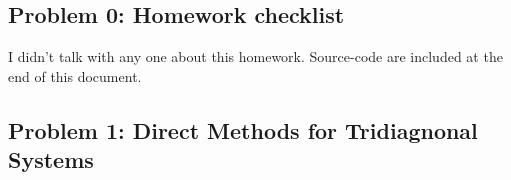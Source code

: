 \documentclass{article}
\begin{document}
 



\hypertarget{problem_0_homework_checklist_2}{}
\subsection*{{Problem 0: Homework checklist}}
\label{problem_0_homework_checklist_2}

\checkmark	I didn't talk with any one about this homework. \newline
\checkmark 	Source-code are included at the end of this document. 

\hypertarget{}{}
\subsection*{{Problem 1: Direct Methods for Tridiagnonal Systems }}
\label{}
\end{document}
